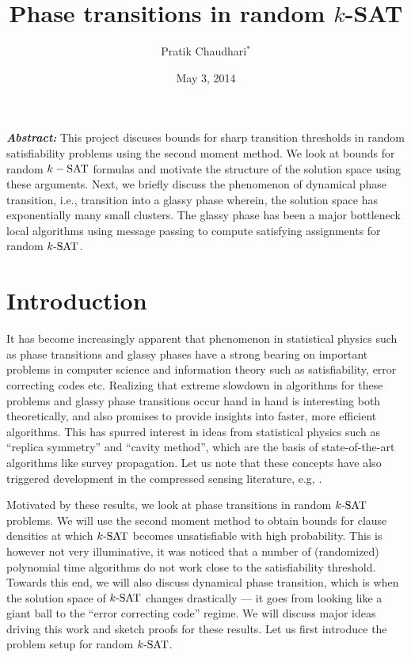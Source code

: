 \documentclass[letterpaper, 10pt, twocolumn, reqno]{amsart}
\title{Phase transitions in random $k$-SAT}
\author{Pratik Chaudhari$^*$}
\date{May 3, 2014}
\begin{document}
\maketitle
{\small
\textbf{\emph{Abstract:}}
This project discuses bounds for sharp transition thresholds in random satisfiability problems using the second moment method. We look at bounds for random $k-\textrm{SAT}$ formulas and motivate the structure of the solution space using these arguments. Next, we briefly discuss the phenomenon of dynamical phase transition, i.e., transition into a glassy phase wherein, the solution space has exponentially many small clusters. The glassy phase has been a major bottleneck local algorithms using message passing to compute satisfying assignments for random $k\textrm{-SAT}$.
}

\section{Introduction}
\label{sec:intro}
It has become increasingly apparent that phenomenon in statistical physics such as phase transitions and glassy phases have a strong bearing on important problems in computer science and information theory such as satisfiability, error correcting codes etc. Realizing that extreme slowdown in algorithms for these problems and glassy phase transitions occur hand in hand is interesting both theoretically, and also promises to provide insights into faster, more efficient algorithms. This has spurred interest in ideas from statistical physics such as ``replica symmetry'' and ``cavity method'', which are the basis of state-of-the-art algorithms like survey propagation. Let us note that these concepts have also triggered development in the compressed sensing literature, e.g, \cite{krzakala2012statistical}.



Motivated by these results, we look at phase transitions in random $k\textrm{-SAT}$ problems. We will use the second moment method to obtain bounds for clause
densities at which $k\textrm{-SAT}$ becomes unsatisfiable with high probability. This is however not very illuminative, it was noticed that a number of (randomized)
polynomial time algorithms do not work close to the satisfiability threshold. Towards this end, we will also discuss dynamical phase transition, which is
when the solution space of $k\textrm{-SAT}$ changes drastically --- it goes from looking like a giant ball to the ``error correcting code'' regime. We will discuss major ideas driving this work and sketch proofs for these results. Let us first introduce the problem setup for random $k\textrm{-SAT}$.
\end{document}
